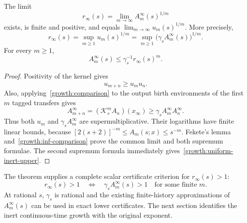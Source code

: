 \begin{theorem}\label{growth:inert-limit}
The limit
\[
 r_\infty(s)=\lim_{m\to\infty}A_m^\infty(s)^{1/m}
\]
exists, is finite and positive, and equals
$\lim_{m\to\infty}u_m(s)^{1/m}$. More precisely,
\begin{equation}\label{growth:sup-formula}
 \boxed{
 r_\infty(s)
 =\sup_{m\ge1}u_m(s)^{1/m}
 =\sup_{m\ge1}\bigl(\gamma_s A_m^\infty(s)\bigr)^{1/m}.
 }
\end{equation}
For every $m\ge1$,
\begin{equation}\label{growth:uniform-inert-upper}
 A_m^\infty(s)\le\gamma_s^{-1}r_\infty(s)^m.
\end{equation}
\end{theorem}
\begin{proof}
Positivity of the kernel gives
\[
 u_{m+n}\ge u_m u_n.
\]
Also, applying~\eqref{growth:comparison} to the output birth environments
of the first $m$ tagged transfers gives
\[
 A_{m+n}^\infty
 =(\mathcal K_s^m A_n)(x_\infty)
 \ge\gamma_s A_m^\infty A_n^\infty.
\]
Thus both $u_m$ and $\gamma_s A_m^\infty$ are supermultiplicative.
Their logarithms have finite linear bounds, because
$[2(s+2)]^{-m}\le A_m(s;x)\le s^{-m}$.
Fekete's lemma and~\eqref{growth:inf-comparison} prove the common limit
and both supremum formulae. The second supremum formula immediately
gives~\eqref{growth:uniform-inert-upper}.
\end{proof}

The theorem supplies a complete scalar certificate criterion for
$r_\infty(s)>1$:
\[
 r_\infty(s)>1
 \quad\Longleftrightarrow\quad
 \gamma_s A_m^\infty(s)>1
 \quad\text{for some finite }m.
\]
At rational $s$, $\gamma_s$ is rational and the existing finite-history
approximations of $A_m^\infty(s)$ can be used in exact lower certificates.
The next section identifies the inert continuous-time growth with the original exponent.

